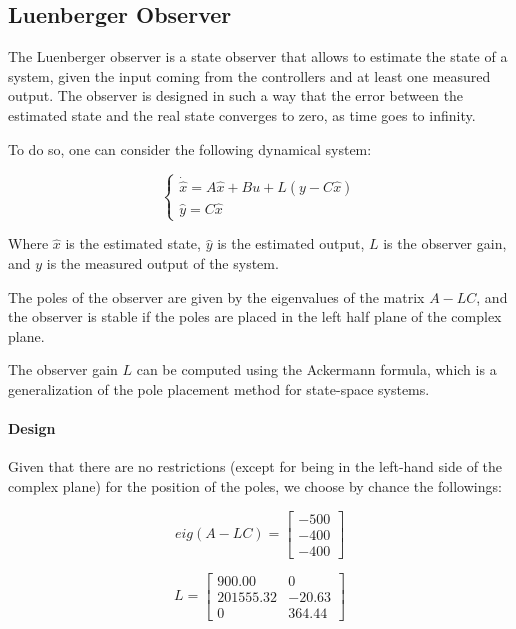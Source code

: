 \subsection{Luenberger Observer}
\label{sec:luenberger_observer}

The Luenberger observer is a state observer that allows to estimate the state of a system, given the input coming from the controllers and at least one measured output.
The observer is designed in such a way that the error between the estimated state and the real state converges to zero, as time goes to infinity.

To do so, one can consider the following dynamical system:

\begin{equation}
    \begin{cases}
        \dot{\hat{x}} = A \hat{x} + B u + L(y - C \hat{x}) \\
        \hat{y} = C \hat{x}
    \end{cases}
    \label{eq:observer_dynamics}
\end{equation}

Where $\hat{x}$ is the estimated state, $\hat{y}$ is the estimated output, $L$ is the observer gain, and $y$ is the measured output of the system.

The poles of the observer are given by the eigenvalues of the matrix $A - LC$, and the observer is stable if the poles are placed in the left half plane of the complex plane.

The observer gain $L$ can be computed using the Ackermann formula, which is a generalization of the pole placement method for state-space systems.

\paragraph{Design}

Given that there are no restrictions (except for being in the left-hand side of the complex plane) for the position of the poles, we choose by chance the followings:

\begin{equation}
    eig(A-LC) =
    \begin{bmatrix}
        -500 \\
        -400 \\
        -400
    \end{bmatrix}
    \label{eq:luenberger_observer_poles}
\end{equation}

\begin{equation}
    L =
    \begin{bmatrix}
        900.00    & 0      \\
        201555.32 & -20.63 \\
        0         & 364.44
    \end{bmatrix}
    \label{eq:L_luemberg}
\end{equation}
